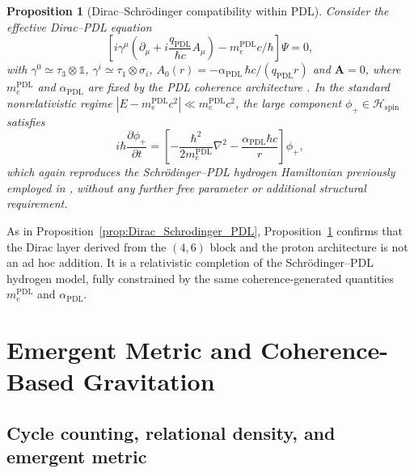 \documentclass[11pt,a4paper]{article}
\newtheorem{proposition}[theorem]{Proposition}
\theoremstyle{definition}
\newcommand{\PDL}{\mathrm{PDL}}
\newcommand{\Hspin}{\mathcal{H}_{\mathrm{spin}}}
\newcommand{\alphaPDL}{\alpha_{\mathrm{PDL}}}
\begin{document}
\begin{proposition}[Dirac–Schrödinger compatibility within PDL]
\label{prop:Dirac_Schrodinger_PDL_2}
Consider the effective Dirac–PDL equation
\begin{equation}
\left[i\gamma^\mu\left(\partial_\mu + i\frac{q_{\PDL}}{\hbar c} A_\mu\right) - m_e^{\PDL} c/\hbar\right]\Psi = 0,
\end{equation}
with $\gamma^0 \simeq \tau_3 \otimes \mathbb{1}$, $\gamma^i \simeq \tau_1 \otimes \sigma_i$, $A_0(r) = -\alphaPDL\,\hbar c/(q_{\PDL} r)$ and $\mathbf{A}=0$, where $m_e^{\PDL}$ and $\alphaPDL$ are fixed by the PDL coherence architecture \cite{PDL,Derivation_alpha_PDL,Schodinger_PDL}. In the standard nonrelativistic regime $|E - m_e^{\PDL} c^2|\ll m_e^{\PDL} c^2$, the large component $\phi_{+}\in\Hspin$ satisfies
\begin{equation}
i\hbar \frac{\partial \phi_{+}}{\partial t}
=
\left[-\frac{\hbar^2}{2 m_e^{\PDL}} \nabla^2
      - \frac{\alphaPDL \hbar c}{r}\right]\phi_{+},
\end{equation}
which again reproduces the Schrödinger–PDL hydrogen Hamiltonian previously employed in \cite{Schodinger_PDL,Sketch_derivation_Schroedinger_PDL}, without any further free parameter or additional structural requirement.
\end{proposition}

\noindent
As in Proposition~\ref{prop:Dirac_Schrodinger_PDL}, Proposition~\ref{prop:Dirac_Schrodinger_PDL_2} confirms that the Dirac layer derived from the $(4,6)$ block and the proton architecture is not an ad hoc addition. It is a relativistic completion of the Schrödinger–PDL hydrogen model, fully constrained by the same coherence-generated quantities $m_e^{\PDL}$ and $\alphaPDL$.

\section{Emergent Metric and Coherence-Based Gravitation}\label{sec:emergent_metric}

\subsection{Cycle counting, relational density, and emergent metric}
\end{document}
